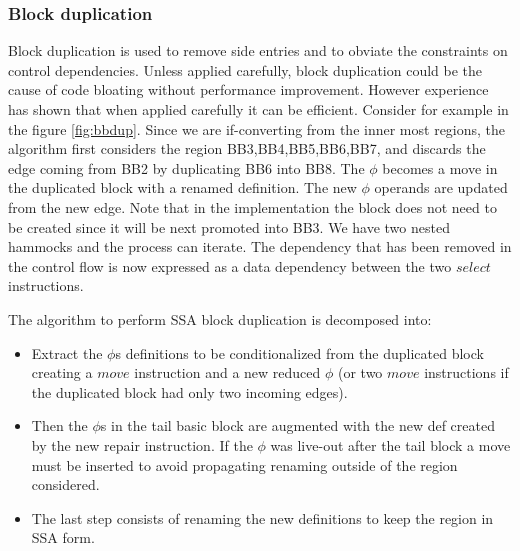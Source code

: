 \subsubsection{Block duplication}

Block duplication is used to remove side entries and to obviate the constraints on control dependencies. Unless applied carefully, block duplication could be the cause of code bloating without performance improvement. However experience has shown that when applied carefully it can be efficient.
Consider for example in the figure \ref{fig:bbdup}. Since we are if-converting from the inner most regions, the algorithm first considers the region {BB3,BB4,BB5,BB6,BB7}, and discards the edge coming from BB2 by duplicating BB6 into BB8. The $\phi$ becomes a move in the duplicated block with a renamed definition. The new $\phi$ operands are updated from the new edge. Note that in the implementation the block does not need to be created since it will be next promoted into BB3. We have two nested hammocks and the process can iterate. The dependency that has been removed in the control flow is now expressed as a data dependency between the two $select$ instructions.

The algorithm to perform SSA block duplication is decomposed into:
\begin{itemize}
\item Extract the $\phi$s definitions to be conditionalized from the duplicated block creating a $move$ instruction and a new reduced $\phi$ (or two $move$ instructions if the duplicated block had only two incoming edges).
\item Then the $\phi$s in the tail basic block are augmented with the new def created by the new repair instruction. If the $\phi$ was live-out after the tail block a move must be inserted to avoid propagating renaming outside of the region considered. 
\item The last step consists of renaming the new definitions to keep the region in SSA form.
\end{itemize}


